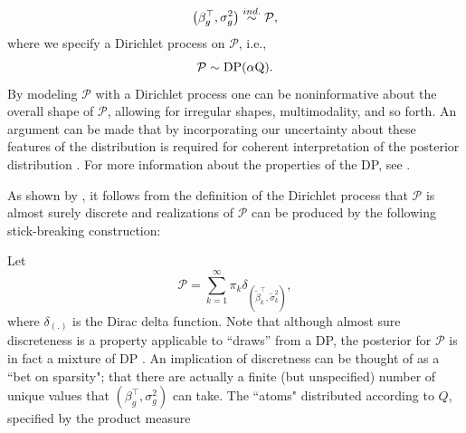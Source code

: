\begin{equation*}
\left(\beta_g^\top,\sigma^2_g\right) \stackrel{ind.}{\sim} \mathcal{P},
\end{equation*}
where we specify a Dirichlet process on $\mathcal{P}$, i.e.,
\begin{equation*}
\mathcal{P} \sim \operatorname{DP}(\alpha \mbox{Q}).
\end{equation*}
\iftoggle{thesis}{
The use of this prior, due to \citet{ferguson}, is a distribution over probability distributions, such that for any finite disjoint partition $\{A_i\}_{i>=1}^n$ on $\mathbb{R}^p$, $\mathcal{P}$ is a random measure such that the joint distribution $\left(\mathcal{P}(A_1),\ldots,\mathcal{P}(A_n)\right) \sim \op{Dir}\left(\alpha Q(A_1),\ldots,\alpha Q(A_n)\right).$ The Dirichlet process has two parameters: $Q$, the base measure, represents a prior guess at the distribution. $\alpha$, the concentration parameter expresses the degree to which $\mathcal{P}$ will agree with $Q$ on any set $A$. This follows from the definition given above and known properties of the Dirichlet distribution, i.e., $\op{E}\left(\mathcal{P}(A)\right)=Q(A)$, and $\op{V}\left(\mathcal{P}(A)\right)=\frac{Q(A)(1 - Q(A)}{\alpha + 1}$, showing that $\mathcal{P}(A) \stackrel{p}{\rightarrow} Q(A)$ as $\alpha \rightarrow \infty$ for any set $A$.
}{}
By modeling $\mathcal{P}$ with a Dirichlet process one can be noninformative about the overall shape of $\mathcal{P}$, allowing for irregular shapes, multimodality, and so forth. An argument can be made that by incorporating our uncertainty about these features of the distribution is required for coherent interpretation of the posterior distribution \citep{walker2010bayesian}. For more information about the properties of the DP, see \cite{ferguson}.

As shown by \citet{sethuraman}, it follows from the definition of the Dirichlet process that $\mathcal{P}$ is almost surely discrete and realizations of $\mathcal{P}$ can be produced by the following stick-breaking construction:

Let 
\begin{equation}
\mathcal{P} =\sum_{k=1}^\infty \pi_k \delta_{\left(\tilde{\beta}_k^\top ,\tilde{\sigma}^2_k\right)},
\end{equation}
where $\delta_{(.)}$ is the Dirac delta function. Note that although almost sure discreteness is a property applicable to ``draws'' from a DP, the posterior for $\mathcal{P}$ is in fact a mixture of DP \citep{antoniak}. An implication of discretness can be thought of as a ``bet on sparsity"; that there are actually a finite (but unspecified) number of unique values that $(\beta_g^\top,\sigma^2_g)$ can take.  
 The ``atoms" distributed according to $Q$, specified by the product measure

